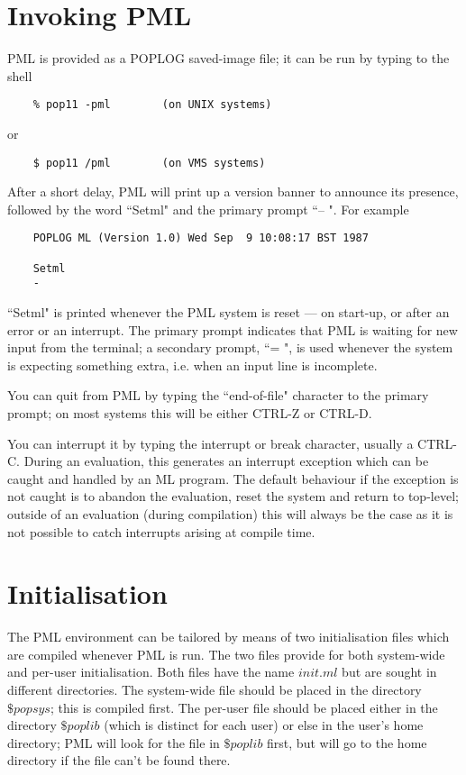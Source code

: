 \section{Invoking PML}                                                                       

PML is provided as a POPLOG saved-image file; it can be run by typing to
the shell
\begin{verbatim}
    % pop11 -pml        (on UNIX systems)
\end{verbatim}

or
\begin{verbatim}
    $ pop11 /pml        (on VMS systems)
\end{verbatim}

After a short delay, PML will print up a version banner to announce its
presence, followed by the word ``Setml" and the primary prompt ``-- ". For
example
\begin{verbatim}
    POPLOG ML (Version 1.0) Wed Sep  9 10:08:17 BST 1987

    Setml
    -
\end{verbatim}

``Setml" is printed whenever the PML system is reset --- on start-up, or
after an error or an interrupt. The primary prompt indicates that PML is
waiting for new input from the terminal; a secondary prompt, ``= ", is
used whenever the system is expecting something extra, i.e. when an
input line is incomplete.

You can quit from PML by typing the ``end-of-file" character to the
primary prompt; on most systems this will be either CTRL-Z or CTRL-D.

You can interrupt it by typing the interrupt or break character, usually
a CTRL-C. During an evaluation, this generates an interrupt exception
which can be caught and handled by an ML program. The default behaviour
if the exception is not caught is to abandon the evaluation, reset the
system and return to top-level; outside of an evaluation (during
compilation) this will always be the case as it is not possible to catch
interrupts arising at compile time.


\section{Initialisation}

The PML environment can be tailored by means of two initialisation files
which are compiled whenever PML is run. The two files provide for both
system-wide and per-user initialisation. Both files have the name
$init.ml$ but are sought in different directories. The system-wide file
should be placed in the directory $\$popsys$; this is compiled first. The
per-user file should be placed either in the directory $\$poplib$ (which is
distinct for each user) or else in the user's home directory; PML will
look for the file in $\$poplib$ first, but will go to the home directory if
the file can't be found there.

